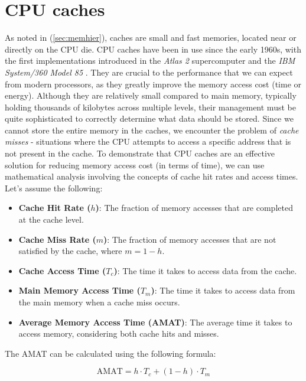 \section{CPU caches}

As noted in (\ref{sec:memhier}), caches are small and fast memories, located near or directly on the CPU die. CPU caches have been in use since the early 1960s, with the first
implementations introduced in the \textit{Atlas 2} supercomputer \cite{oldcomputercache2} and the \textit{IBM System/360 Model 85} \cite{oldcomputercache1}. They are crucial to the
performance that we can expect from modern processors, as they greatly improve the memory access cost (time or energy). Although they are relatively small compared to main memory,
typically holding thousands of kilobytes across multiple levels, their management must be quite sophisticated to correctly determine what data should be stored. Since we cannot %
store the entire memory in the caches, we encounter the problem of \textit{cache misses} - situations where the CPU attempts to access a specific address that is not present in the
cache. To demonstrate that CPU caches are an effective solution for reducing memory access cost (in terms of time), we can use mathematical analysis involving the concepts of cache %
hit rates and access times. Let's assume the following:

\begin{itemize}
    \item \textbf{Cache Hit Rate ($h$)}: The fraction of memory accesses that are completed at the cache level.
    \item \textbf{Cache Miss Rate ($m$)}: The fraction of memory accesses that are not satisfied by the cache, where $m = 1 - h$.
    \item \textbf{Cache Access Time ($T_c$)}: The time it takes to access data from the cache.
    \item \textbf{Main Memory Access Time ($T_m$)}: The time it takes to access data from the main memory when a cache miss occurs.
    \item \textbf{Average Memory Access Time (AMAT)}: The average time it takes to access memory, considering both cache hits and misses.
\end{itemize}

\noindent The AMAT can be calculated using the following formula:

\[
\text{AMAT} = h \cdot T_c + (1 - h) \cdot T_m
\]

